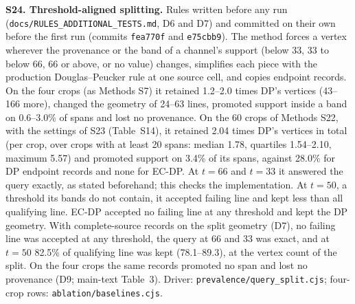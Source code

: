 \documentclass[11pt]{article}
\begin{document}
\vspace{4mm}
\noindent\textbf{S24. Threshold-aligned splitting.} Rules written before any run (\texttt{docs/\allowbreak RULES\_\allowbreak ADDITIONAL\_\allowbreak TESTS.md}, D6 and D7) and committed on their own before the first run (commits \texttt{fea770f} and \texttt{e75cbb9}). The method forces a vertex wherever the provenance or the band of a channel's support (below 33, 33 to below 66, 66 or above, or no value) changes, simplifies each piece with the production Douglas--Peucker rule at one source cell, and copies endpoint records. On the four crops (as Methods S7) it retained 1.2--2.0 times DP's vertices (43--166 more), changed the geometry of 24--63 lines, promoted support inside a band on 0.6--3.0\% of spans and lost no provenance. On the 60 crops of Methods S22, with the settings of S23 (Table~S14), it retained 2.04 times DP's vertices in total (per crop, over crops with at least 20 spans: median 1.78, quartiles 1.54--2.10, maximum 5.57) and promoted support on 3.4\% of its spans, against 28.0\% for DP endpoint records and none for EC-DP. At $t=66$ and $t=33$ it answered the query exactly, as stated beforehand; this checks the implementation. At $t=50$, a threshold its bands do not contain, it accepted failing line and kept less than all qualifying line. EC-DP accepted no failing line at any threshold and kept the DP geometry. With complete-source records on the split geometry (D7), no failing line was accepted at any threshold, the query at 66 and 33 was exact, and at $t=50$ 82.5\% of qualifying line was kept (78.1--89.3), at the vertex count of the split. On the four crops the same records promoted no span and lost no provenance (D9; main-text Table~3). Driver: \texttt{prevalence/query\_split.cjs}; four-crop rows: \texttt{ablation/baselines.cjs}.
\end{document}
